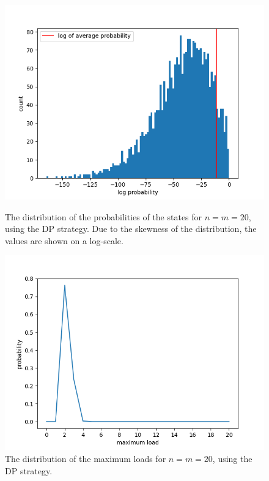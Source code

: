 \begin{figure}
\centering
\begin{minipage}[t]{.48\linewidth}
  \centering
  \includegraphics[scale=0.5]{Chapter4/Figs/state_distribution_20_20_all_log_count.png}
  \caption{The distribution of the probabilities of the states for $n=m=20$, using the DP strategy. Due to the skewness of the distribution, the values are shown on a log-scale.}
  \label{two-thinning-state-distribution}
\end{minipage}\hfill
\begin{minipage}[t]{.48\linewidth}
  \centering
  \includegraphics[scale=0.5]{Chapter4/Figs/max_load_distribution_20_20.png}
  \caption{The distribution of the maximum loads for $n=m=20$, using the DP strategy.}
  \label{two-thinning-maxload-distribution}
\end{minipage}
\end{figure}



